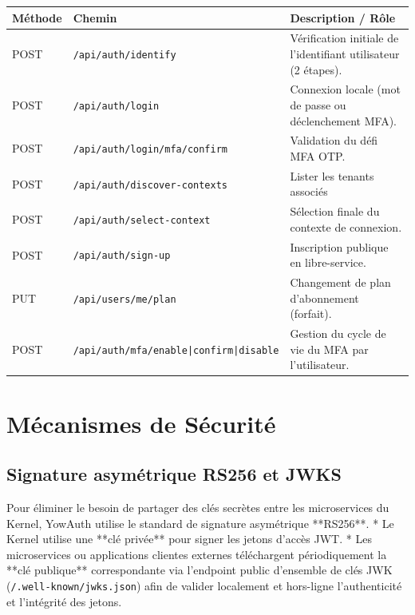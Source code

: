 \documentclass[11pt,a4paper,oneside]{report}
\newcommand{\code}[1]{\texttt{\small #1}}
\begin{document}
\begin{center}
\small
\begin{longtable}{@{}p{1.2cm}p{6cm}p{7cm}@{}}
\toprule
\textbf{Méthode} & \textbf{Chemin} & \textbf{Description / Rôle} \\
\midrule
POST & \code{/api/auth/identify} & Vérification initiale de l'identifiant utilisateur (2 étapes). \\
POST & \code{/api/auth/login} & Connexion locale (mot de passe ou déclenchement MFA). \\
POST & \code{/api/auth/login/mfa/confirm} & Validation du défi MFA OTP. \\
POST & \code{/api/auth/discover-contexts} & Lister les tenants associés \\
POST & \code{/api/auth/select-context} & Sélection finale du contexte de connexion. \\
POST & \code{/api/auth/sign-up} & Inscription publique en libre-service. \\
PUT  & \code{/api/users/me/plan} & Changement de plan d'abonnement (forfait). \\
POST & \code{/api/auth/mfa/enable|confirm|disable} & Gestion du cycle de vie du MFA par l'utilisateur. \\
\bottomrule
\end{longtable}
\end{center}

\section{Mécanismes de Sécurité}

\subsection{Signature asymétrique RS256 et JWKS}
Pour éliminer le besoin de partager des clés secrètes entre les microservices du Kernel, YowAuth utilise le standard de signature asymétrique **RS256**. 
* Le Kernel utilise une **clé privée** pour signer les jetons d'accès JWT.
* Les microservices ou applications clientes externes téléchargent périodiquement la **clé publique** correspondante via l'endpoint public d'ensemble de clés JWK (\code{/.well-known/jwks.json}) afin de valider localement et hors-ligne l'authenticité et l'intégrité des jetons.
\end{document}
